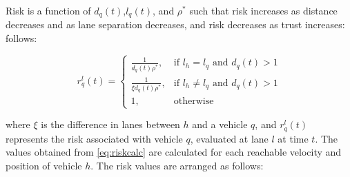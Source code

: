 \documentclass[letterpaper, 10 pt, conference]{ieeeconf}  %
\newcommand\NB[1]{$\spadesuit$\footnote{NB: #1}}
\newcommand\RP[1]{$\clubsuit$\footnote{RP: #1}}
\begin{document}



Risk is a function of $d_q(t)$,$l_q(t)$, and $\rho^*$ %
such that risk increases as distance decreases and as lane separation decreases, and risk decreases as trust increases: follows: %

\begin{equation} \label{eq:riskcalc}
    r_{q}^{l}(t) =
    \begin{cases}
    \frac{1}{d_{q}(t)\rho^*},  & \text{if } l_h=l_q \text{ and } d_{q}(t) > 1  \\
    \frac{1}{\xi d_{q}(t)\rho^*},  & \text{if } l_h\neq l_q \text{ and } d_{q}(t) > 1  \\
        1,                     & \text{otherwise}  
    \end{cases}
\end{equation}

where $\xi$ is the difference in lanes between $h$ and a vehicle $q$,
and $r_{q}^{l}(t)$ represents the risk associated with vehicle $q$, evaluated at lane $l$ at time $t$. The values obtained from \eqref{eq:riskcalc} are calculated for each reachable velocity and position of vehicle $h$. The risk values are arranged as follows: %
\end{document}
